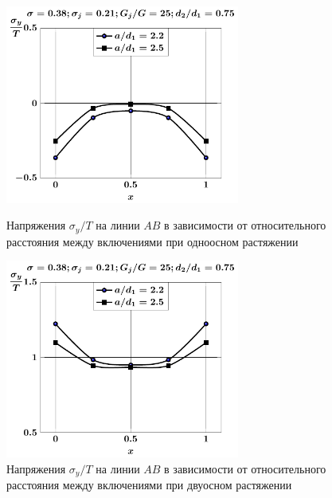 \begin{russian}
\begin{figure}[h!]
\centering\footnotesize
\parbox[b]{7.5cm}{\centering\includegraphics[width=7.7cm]{inc13-a-d75-g25-t1-sig_y-ab.pdf}
\caption{Напряжения $\sigma_y/T$ на линии $AB$ в зависимости от относительного расстояния между включениями при одноосном растяжении
\label{f:9:77}}}\hfil\hfil
\parbox[b]{7.5cm}{\centering\includegraphics[width=7.7cm]{inc13-a-d75-g25-t2-sig_y-ab.pdf}
\caption{Напряжения $\sigma_y/T$ на линии $AB$ в зависимости от относительного расстояния между включениями при двуосном растяжении
\label{f:9:78}}}
\end{figure}


\end{russian}
